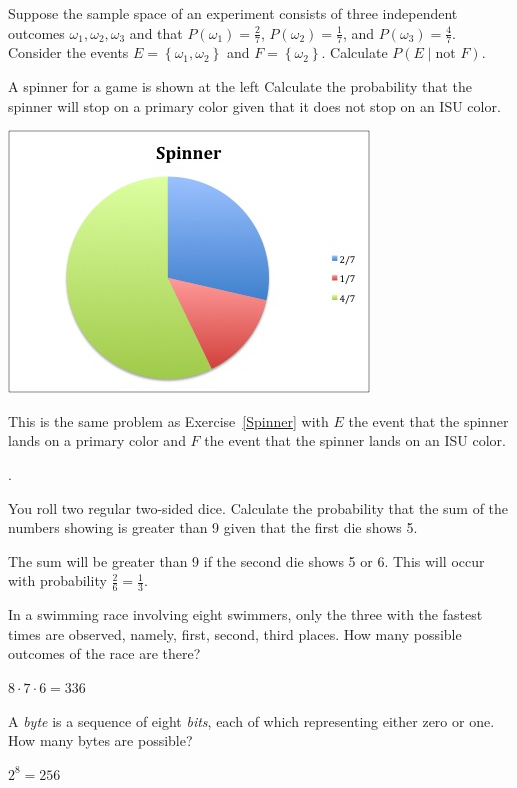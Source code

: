 \documentclass[12pt]{exam}
\begin{document}
\begin{questions}
\question\label{Spinner} Suppose the sample space of an experiment
consists of three independent
outcomes $\omega_1,\omega_2,\omega_3$ and that
$P\left(\omega_1\right)=\frac{2}{7}$, $P\left(\omega_2\right)=\frac{1}{7}$,
and $P\left(\omega_3\right)=\frac{4}{7}$. Consider the events
$E=\left\{\omega_1,\omega_2\right\}$ and $F=\left\{\omega_2\right\}$.
Calculate $P\left(E\mid\text{not $F$}\right)$.
\begin{multicols}{2}
\question A spinner for a game is shown at the left
Calculate the probability that the spinner will stop
on a primary color given that it does not stop on an ISU color.
\begin{center}\includegraphics[scale=.6]{ReviewSpinner}\end{center}
\end{multicols}
\begin{solution} This is the same problem as Exercise~\ref{Spinner}
with $E$ the event that the spinner lands on a primary
color and $F$ the event that the spinner lands on an ISU color.
\end{solution}.

\question You roll two regular two-sided dice. Calculate the probability
that the sum of the numbers showing is greater than 9 given that
the first die shows 5.
\begin{solution} The sum will be greater than 9 if the second die
shows 5 or 6. This will occur with probability $\frac{2}{6}=\frac{1}{3}$.
\end{solution}

\question In a swimming race involving eight swimmers, only the three
with the fastest times are observed, namely, first, second, third places.
How many possible outcomes of the race are there?
\begin{solution} $8\cdot 7\cdot 6=336$ \end{solution}
\question A {\em byte} is a sequence of eight {\em bits}, each
of which representing either zero or one. How many bytes are possible?
\begin{solution} $2^8=256$\end{solution}


\end{questions}
\end{document}
